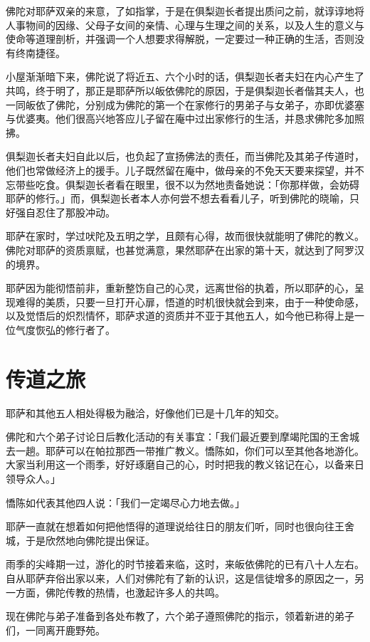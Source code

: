 \documentclass[12pt,twoside,openany]{book}
\begin{document}
佛陀对耶萨双亲的来意，了如指掌，于是在俱梨迦长者提出质问之前，就谆谆地将人事物间的因缘、父母子女间的亲情、心理与生理之间的关系，以及人生的意义与使命等道理剖析，并强调一个人想要求得解脱，一定要过一种正确的生活，否则没有终南捷径。

小屋渐渐暗下来，佛陀说了将近五、六个小时的话，俱梨迦长者夫妇在内心产生了共鸣，终于明了，那正是耶萨所以皈依佛陀的原因，于是俱梨迦长者偕其夫人，也一同皈依了佛陀，分别成为佛陀的第一个在家修行的男弟子与女弟子，亦即优婆塞与优婆夷。他们很高兴地答应儿子留在庵中过出家修行的生活，并恳求佛陀多加照拂。

俱梨迦长者夫妇自此以后，也负起了宣扬佛法的责任，而当佛陀及其弟子传道时，他们也常做经济上的援手。儿子既然留在庵中，做母亲的不免天天要来探望，并不忘带些吃食。俱梨迦长者看在眼里，很不以为然地责备她说：「你那样做，会妨碍耶萨的修行。」而，俱梨迦长者本人亦何尝不想去看看儿子，听到佛陀的晓喻，只好强自忍住了那股冲动。

耶萨在家时，学过吠陀及五明之学，且颇有心得，故而很快就能明了佛陀的教义。佛陀对耶萨的资质禀赋，也甚觉满意，果然耶萨在出家的第十天，就达到了阿罗汉的境界。

耶萨因为能彻悟前非，重新整饬自己的心灵，远离世俗的执着，所以耶萨的心，呈现难得的美质，只要一旦打开心扉，悟道的时机很快就会到来，由于一种使命感，以及觉悟后的炽烈情怀，耶萨求道的资质并不亚于其他五人，如今他已称得上是一位气度恢弘的修行者了。

\section{传道之旅}\label{sec3.2}

耶萨和其他五人相处得极为融洽，好像他们已是十几年的知交。

佛陀和六个弟子讨论日后教化活动的有关事宜：「我们最近要到摩竭陀国的王舍城去一趟。耶萨可以在帕拉那西一带推广教义。憍陈如，你们可以至其他各地游化。大家当利用这一个雨季，好好琢磨自己的心，时时把我的教义铭记在心，以备来日领导众人。」

憍陈如代表其他四人说：「我们一定竭尽心力地去做。」

耶萨一直就在想着如何把他悟得的道理说给往日的朋友们听，同时也很向往王舍城，于是欣然地向佛陀提出保证。

雨季的尖峰期一过，游化的时节接着来临，这时，来皈依佛陀的已有八十人左右。自从耶萨弃俗出家以来，人们对佛陀有了新的认识，这是信徒增多的原因之一，另一方面，佛陀传教的热情，也激起许多人的共鸣。

现在佛陀与弟子准备到各处布教了，六个弟子遵照佛陀的指示，领着新进的弟子们，一同离开鹿野苑。
\end{document}
